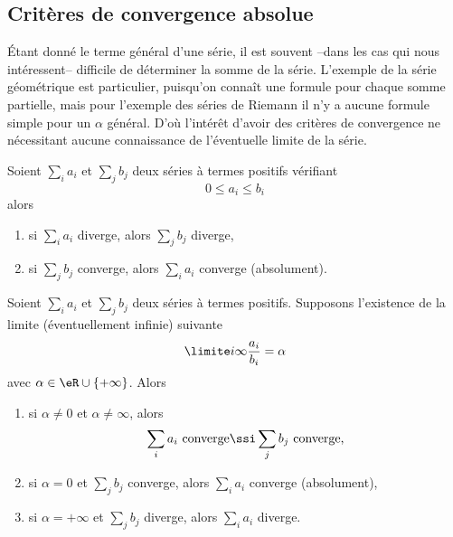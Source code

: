 \subsection{Critères de convergence absolue}

Étant donné le terme général d'une série, il est souvent --dans les cas qui nous intéressent-- difficile de déterminer la somme de la série. L'exemple de la série géométrique est particulier, puisqu'on connaît une formule pour chaque somme partielle, mais pour l'exemple des séries de Riemann il n'y a aucune formule simple pour un $\alpha$ général. D'où l'intérêt d'avoir des critères de convergence ne nécessitant aucune connaissance de l'éventuelle limite de la série.

\begin{lemma}   \label{LemgHWyfG}
Soient $\sum_i a_i$ et $\sum_j
b_j$ deux séries à termes positifs vérifiant
\begin{equation*}
  0 \leq a_i \leq b_i
\end{equation*}
alors
\begin{enumerate}
\item si $\sum_i a_i$ diverge, alors $\sum_j b_j$ diverge,
\item si $\sum_j b_j$ converge, alors $\sum_i a_i$ converge
  (absolument).
  \end{enumerate}
\end{lemma}


\begin{proposition}
 Soient $\sum_i a_i$ et $\sum_j b_j$ deux séries à termes positifs. Supposons l'existence de la limite (éventuellement infinie) suivante
\begin{equation}
  \limite i \infty \frac{a_i}{b_i} = \alpha 
\end{equation}
avec \( \alpha\in \eR\cup\{ +\infty \}\). Alors
\begin{enumerate}
\item si $\alpha \neq 0$ et $\alpha\neq \infty$, alors
  \begin{equation}
    \sum_i a_i \text{~converge} \ssi \sum_j b_j\text{~converge,}
  \end{equation}
\item si $\alpha = 0$ et $\sum_j b_j$ converge, alors $\sum_i a_i$
  converge (absolument),
\item si $\alpha = +\infty$ et $\sum_j b_j$ diverge, alors $\sum_i
  a_i$ diverge.
\end{enumerate}
\end{proposition}

